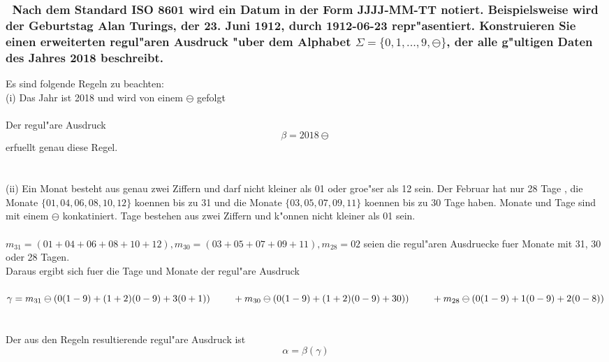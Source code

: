 \documentclass{article}
\newcommand{\tab}{\null\ \qquad}
\newcommand{\gap}{\null\ \\ \\}
\begin{document}
\subsubsection{\
    Nach dem Standard ISO 8601 wird ein Datum in der Form JJJJ-MM-TT notiert.
        Beispielsweise wird der Geburtstag Alan Turings, der 23. Juni 1912, 
        durch 1912-06-23 repr"asentiert. Konstruieren Sie einen erweiterten 
        regul"aren Ausdruck "uber dem Alphabet $\Sigma = \{0,1,...,9, \ominus\}$,
        der alle g"ultigen Daten des Jahres 2018 beschreibt.
    }
Es sind folgende Regeln zu beachten:\\
(i) Das Jahr ist 2018 und wird von einem $\ominus$ gefolgt\\
\\
Der regul"are Ausdruck\[
    \beta = 2018 \ominus
    \]
erfuellt genau diese Regel.\\
\gap
(ii) Ein Monat besteht aus genau zwei Ziffern und darf nicht kleiner als 01 oder
    groe"ser als 12 sein. Der Februar hat nur 28 Tage
    , die Monate $\{01,04,06,08,10,12\}$ koennen bis zu 31 
    und die Monate $\{03,05,07,09,11\}$ koennen bis zu 30 Tage haben.
    Monate und Tage sind mit einem $\ominus$ konkatiniert.
    Tage bestehen aus zwei Ziffern und k"onnen nicht kleiner als 01 sein.\\
\\
$m_{31} = (01+04+06+08+10+12), m_{30} = (03+05+07+09+11), m_{28} = 02$ seien die
    regul"aren Ausdruecke fuer Monate mit 31, 30 oder 28 Tagen.\\
Daraus ergibt sich fuer die Tage und Monate der regul"are Ausdruck\\
\\
$\gamma = m_{31} \ominus (0(1-9)+(1+2)(0-9)+3(0+1))\\
    \tab + m_{30} \ominus (0(1-9)+(1+2)(0-9)+30))\\
    \tab + m_{28} \ominus (0(1-9)+1(0-9)+2(0-8))
    $\\
\gap
Der aus den Regeln resultierende regul"are Ausdruck ist\[
    \alpha = \beta (\gamma)
    \]
\end{document}
